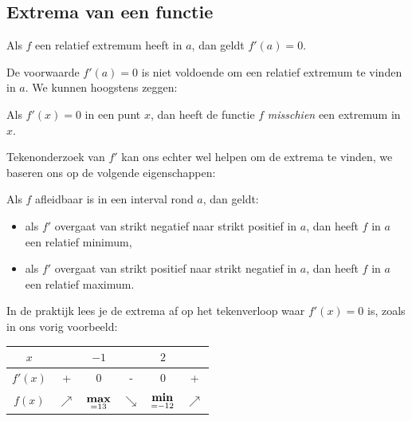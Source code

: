 \documentclass[12pt]{article}
\newenvironment{eigenschap}
{
  \begin{mdframed}[nobreak=true,frametitle={Eigenschap}]
  }{%
  \end{mdframed}
}
\newenvironment{kader}
{
  \begin{mdframed}[nobreak=true]
  }{%
  \end{mdframed}
}
\begin{document}

\subsection{Extrema van een functie}

\begin{eigenschap}
  Als $f$ een relatief extremum heeft in $a$, dan geldt $f'(a)=0$.
\end{eigenschap}

De voorwaarde $f'(a)=0$ is niet voldoende om een relatief extremum te vinden in $a$. We kunnen hoogstens zeggen:

\begin{kader}
  Als $f'(x)=0$ in een punt $x$, dan heeft de functie $f$ {\em misschien} een extremum in $x$.
\end{kader}
Tekenonderzoek van $f'$ kan ons echter wel helpen om de extrema te vinden, we baseren ons op de volgende eigenschappen:

\begin{eigenschap}
  Als $f$ afleidbaar is in een interval rond $a$, dan geldt:
  \begin{itemize}
  \item als $f'$ overgaat van strikt negatief naar strikt positief in $a$, dan heeft $f$ in $a$ een relatief minimum,
  \item als $f'$ overgaat van strikt positief naar strikt negatief in $a$, dan heeft $f$ in $a$ een relatief maximum.
  \end{itemize}
\end{eigenschap}

In de praktijk lees je de extrema af op het tekenverloop waar $f'(x)=0$ is, zoals in ons vorig voorbeeld:

\begin{center}
  \begin{tabular}{c|ccccc}
    $x$ & \hspace*{1.0cm} & $-1$ & \hspace*{1.0cm} & $2$ & \hspace*{1.0cm}\\
    \hline
    $f'(x)$ & + & 0 & - & 0 & +\\
    \hline
    $f(x)$ & $\nearrow$ &  $\underset{=13}{\bf max}$ & $\searrow$ & $\underset{=-12}{\bf min}$ & $\nearrow$
  \end{tabular}
\end{center}
\end{document}
